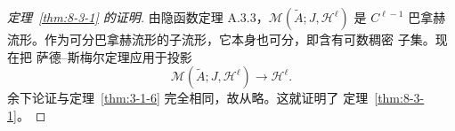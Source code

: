 \begin{proof}[定理~\ref{thm:8-3-1} 的证明]
由隐函数定理 A.3.3，$\mathcal M(\widetilde A;J,\mathcal H^\ell)$ 是
$C^{\ell-1}$ 巴拿赫流形。作为可分巴拿赫流形的子流形，它本身也可分，即含有可数稠密
子集。现在把 萨德--斯梅尔定理应用于投影
\[
  \mathcal M(\widetilde A;J,\mathcal H^\ell)\longrightarrow\mathcal H^\ell.
\]
余下论证与定理~\ref{thm:3-1-6} 完全相同，故从略。这就证明了
定理~\ref{thm:8-3-1}。
\end{proof}
